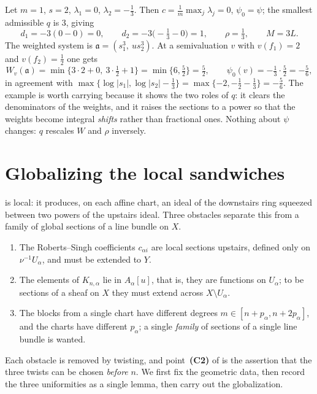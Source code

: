 \begin{example}
\label{ex:ch44-encoding-numbers}
Let $m=1$, $s=2$, $\lambda_1=0$, $\lambda_2=-\tfrac13$.  Then
$c=\frac1m\max_j\lambda_j=0$, $\psi_0=\psi$; the smallest admissible
$q$ is $3$, giving
\[
 d_1=-3(0-0)=0,
 \qquad
 d_2=-3\bigl(-\tfrac13-0\bigr)=1,
 \qquad
 \rho=\tfrac13,
 \qquad
 M=3L .
\]
The weighted system is $\mathfrak a=(s_1^3,\ us_2^3)$.  At a semivaluation
$v$ with $v(f_1)=2$ and $v(f_2)=\tfrac12$ one gets
\[
 W_v(\mathfrak a)=\min\{3\cdot2+0,\ 3\cdot\tfrac12+1\}=\min\{6,\tfrac52\}
 =\tfrac52,
 \qquad
 \psi_0(v)=-\tfrac13\cdot\tfrac52=-\tfrac56,
\]
in agreement with
$\max\{\log|s_1|,\log|s_2|-\tfrac13\}=\max\{-2,-\tfrac12-\tfrac13\}
=-\tfrac56$.  The example is worth carrying because it shows the two roles
of $q$: it clears the denominators of the weights, and it raises the
sections to a power so that the weights become integral \emph{shifts} rather
than fractional ones.  Nothing about $\psi$ changes: $q$ rescales
$W$ and $\rho$ inversely.
\end{example}

\section{Globalizing the local sandwiches}
\label{sec:ch44-globalization}

 is local: it produces, on each affine
chart, an ideal of the downstairs ring squeezed between two powers of the
upstairs ideal.  Three obstacles separate this from a family of global
sections of a line bundle on $X$.

\begin{enumerate}
\item The Roberts--Singh coefficients $c_{\alpha i}$ are local sections
      upstairs, defined only on $\nu^{-1}U_\alpha$, and must be extended
      to $Y$.
\item The elements of $K_{n,\alpha}$ lie in $A_\alpha[u]$, that is,
      they are functions on $U_\alpha$; to be sections of a sheaf on $X$
      they must extend across $X\setminus U_\alpha$.
\item The blocks from a single chart have different degrees
      $m\in[n+p_\alpha,n+2p_\alpha]$, and the charts have different
      $p_\alpha$; a single \emph{family} of sections of a single line
      bundle is wanted.
\end{enumerate}

Each obstacle is removed by twisting, and point~\textbf{(C2)} of
 is the assertion that the three twists can be chosen
\emph{before} $n$.  We first fix the geometric data, then record the three
uniformities as a single lemma, then carry out the globalization.

